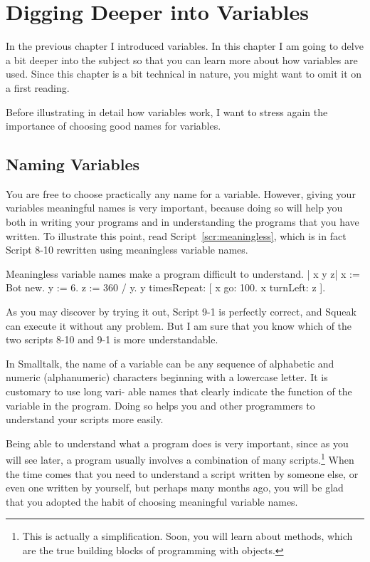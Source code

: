 \documentclass[a4paper,10pt,twoside]{book}
\begin{document}
    \sloppy
\fi

\chapter{Digging Deeper into Variables}\label{cha:deeperVariable}


In the previous chapter I introduced variables. In this chapter I am going to delve a bit deeper  into the subject so that you can learn more about how variables are used. Since this chapter is a bit technical in nature, you might want to omit it on a first reading. 

Before illustrating in detail how variables work, I want to stress again the importance of 
choosing good names for variables. 

\section*{Naming Variables}

You are free to choose practically any name for a variable. However, giving your variables 
meaningful names is very important, because doing so will help you both in writing your 
programs and in understanding the programs that you have written. To illustrate this point, 
read Script~\ref{scr:meaningless}, which is in fact Script 8-10 rewritten using meaningless variable names. 


\begin{script}[meaningless]{Meaningless variable names make a program difficult to understand. }
	| x y z| 
	x := Bot new. 
	y := 6. 
	z := 360 / y. 
	y timesRepeat: 
		[ x go: 100. 
		x turnLeft: z ]. 
\end{script}

As you may discover by trying it out, Script 9-1 is perfectly correct, and Squeak can execute 
it without any problem. But I am sure that you know which of the two scripts 8-10 and 9-1 is 
more understandable. 

In Smalltalk, the name of a variable can be any sequence of alphabetic and numeric 
(alphanumeric) characters beginning with a lowercase letter. It is customary to use long vari- 
able names that clearly indicate the function of the variable in the program. Doing so helps 
you and other programmers to understand your scripts more easily. 

Being able to understand what a program does is very important, since as you will see 
later, a program usually involves a combination of many scripts.\footnote{This is actually a simplification. Soon, you will learn about methods, which are the true building 
blocks of programming with objects.} When the time comes that you need to understand a script written by someone else, or even one written by yourself, but perhaps many months ago, you will be glad that you adopted the habit of choosing meaningful variable names. 
\end{document}
